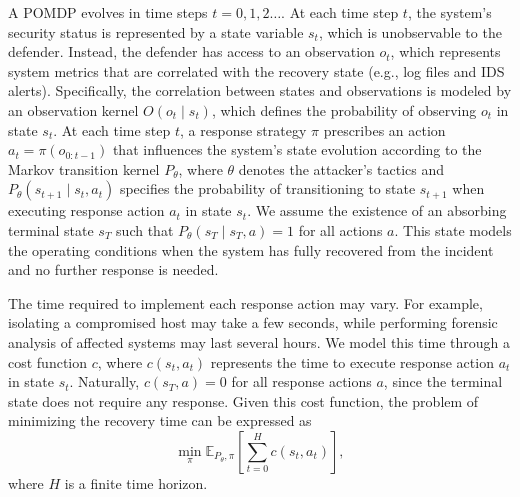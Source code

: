 \documentclass[sigconf]{acmart}
\begin{document}
A POMDP evolves in time steps $t=0,1,2\hdots$. At each time step $t$, the system's security status is represented by a state variable $s_t$, which is unobservable to the defender. Instead, the defender has access to an observation $o_t$, which represents system metrics that are correlated with the recovery state (e.g., log files and IDS alerts). Specifically, the correlation between states and observations is modeled by an observation kernel $O(o_t \mid s_t)$, which defines the probability of observing $o_t$ in state $s_t$. At each time step $t$, a response strategy $\pi$ prescribes an action $a_t=\pi(o_{0:t-1})$ that influences the system's state evolution according to the Markov transition kernel $P_\theta$, where $\theta$ denotes the attacker's tactics and $P_\theta(s_{t+1}\mid s_t, a_t)$ specifies the probability of transitioning to state $s_{t+1}$ when executing response action $a_t$ in state $s_t$. We assume the existence of an absorbing terminal state $s_T$ such that $P_\theta(s_T\mid s_T, a)=1$ for all actions $a$. This state models the operating conditions when the system has fully recovered from the incident and no further response is needed.

The time required to implement each response action may vary. For example, isolating a compromised host may take a few seconds, while performing forensic analysis of affected systems may last several hours. We model this time through a cost function $c$, where $c(s_t, a_t)$ represents the time to execute response action $a_t$ in state $s_t$. Naturally, $c(s_T, a)=0$ for all response actions $a$, since the terminal state does not require any response. Given this cost function, the problem of minimizing the recovery time can be expressed as
\begin{equation}
\label{eq:pomdp}
\min_{\pi}\mathbb{E}_{P_\theta,\pi}\left[ \sum_{t=0}^H c(s_t,a_t)\right],
\end{equation}
where $H$ is a finite time horizon. 

\end{document}
